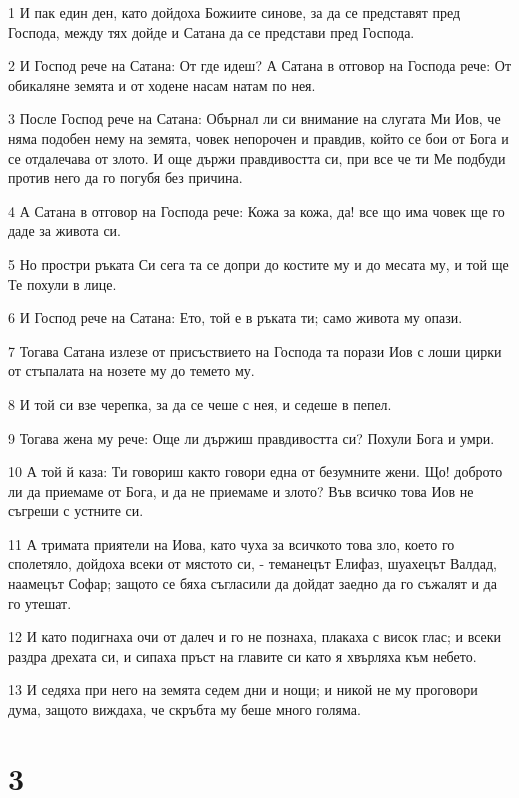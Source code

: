 \par 1 И пак един ден, като дойдоха Божиите синове, за да се представят пред Господа, между тях дойде и Сатана да се представи пред Господа.
\par 2 И Господ рече на Сатана: От где идеш? А Сатана в отговор на Господа рече: От обикаляне земята и от ходене насам натам по нея.
\par 3 После Господ рече на Сатана: Обърнал ли си внимание на слугата Ми Иов, че няма подобен нему на земята, човек непорочен и правдив, който се бои от Бога и се отдалечава от злото. И още държи правдивостта си, при все че ти Ме подбуди против него да го погубя без причина.
\par 4 А Сатана в отговор на Господа рече: Кожа за кожа, да! все що има човек ще го даде за живота си.
\par 5 Но простри ръката Си сега та се допри до костите му и до месата му, и той ще Те похули в лице.
\par 6 И Господ рече на Сатана: Ето, той е в ръката ти; само живота му опази.
\par 7 Тогава Сатана излезе от присъствието на Господа та порази Иов с лоши цирки от стъпалата на нозете му до темето му.
\par 8 И той си взе черепка, за да се чеше с нея, и седеше в пепел.
\par 9 Тогава жена му рече: Още ли държиш правдивостта си? Похули Бога и умри.
\par 10 А той й каза: Ти говориш както говори една от безумните жени. Що! доброто ли да приемаме от Бога, и да не приемаме и злото? Във всичко това Иов не съгреши с устните си.
\par 11 А тримата приятели на Иова, като чуха за всичкото това зло, което го сполетяло, дойдоха всеки от мястото си, - теманецът Елифаз, шуахецът Валдад, наамецът Софар; защото се бяха съгласили да дойдат заедно да го съжалят и да го утешат.
\par 12 И като подигнаха очи от далеч и го не познаха, плакаха с висок глас; и всеки раздра дрехата си, и сипаха пръст на главите си като я хвърляха към небето.
\par 13 И седяха при него на земята седем дни и нощи; и никой не му проговори дума, защото виждаха, че скръбта му беше много голяма.

\chapter{3}

